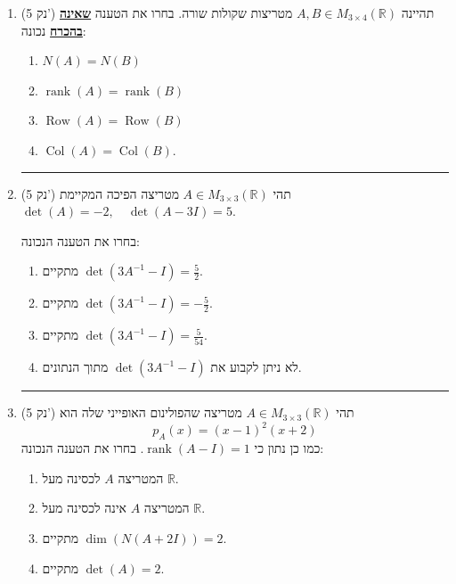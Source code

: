 \documentclass[12pt, a4paper]{article}
\newcommand{\rr}{\mathbb{R}}
\DeclareMathOperator{\rank}{rank}
\newcommand{\points}[1]{(#1 נק') }
\DeclareMathOperator{\row}{Row}
\DeclareMathOperator{\col}{Col}
\begin{document}
\begin{enumerate}
\begin{enumerate}
\end{enumerate}

\noindent\rule{16cm}{0.4pt}

\item\points{5}
תהיינה
$A,B\in M_{3\times 4}(\rr)$
מטריצות שקולות שורה.
בחרו את הטענה
\underline{
\textbf{שאינה בהכרח}}
נכונה:
\begin{enumerate}
\item
$N(A)=N(B)$

\item
$\rank(A)=\rank(B)$

\item
$\row(A)=\row(B)$

\item[\fbox{\textcircled{ד}}]
$\col(A)=\col(B)$.

\end{enumerate}


\noindent\rule{16cm}{0.4pt}

\item\points{5}
תהי
$A\in M_{3\times 3}(\rr)$
מטריצה הפיכה המקיימת
$\det(A)=-2, \quad \det(A-3I)=5$.

בחרו את הטענה הנכונה:
\begin{enumerate}
\item[\fbox{\textcircled{א}}]
מתקיים
$\det(3A^{-1}-I)=\frac{5}{2}$.

\item
מתקיים
$\det(3A^{-1}-I)=-\frac{5}{2}$.

\item
מתקיים
$\det(3A^{-1}-I)=\frac{5}{54}$.

\item
לא ניתן לקבוע את
$\det(3A^{-1}-I)$
מתוך הנתונים.
\end{enumerate}

\noindent\rule{16cm}{0.4pt}


\item\points{5}
תהי
$A\in M_{3\times 3}(\rr)$
מטריצה שהפולינום האופייני שלה הוא
$$p_A(x)=(x-1)^2(x+2)$$
כמו כן נתון כי
$\rank(A-I)=1$.
בחרו את הטענה הנכונה:
\begin{enumerate}
\item[\fbox{\textcircled{א}}]
המטריצה
$A$
לכסינה מעל
$\rr$.

\item
המטריצה
$A$
אינה לכסינה מעל
$\rr$.

\item
מתקיים
$\dim(N(A+2I))=2$.

\item
מתקיים
$\det(A)=2$.
\end{enumerate}


\pagebreak

\end{enumerate}
\end{document}
